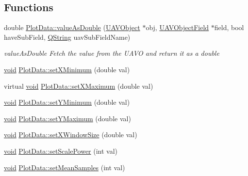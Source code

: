 \subsection*{\-Functions}
\begin{DoxyCompactItemize}
\item 
double \hyperlink{group___scope_plugin_ga7a54fec6758e8641d8baaefca4deddc9}{\-Plot\-Data\-::value\-As\-Double} (\hyperlink{class_u_a_v_object}{\-U\-A\-V\-Object} $\ast$obj, \hyperlink{class_u_a_v_object_field}{\-U\-A\-V\-Object\-Field} $\ast$field, bool have\-Sub\-Field, \hyperlink{group___u_a_v_objects_plugin_gab9d252f49c333c94a72f97ce3105a32d}{\-Q\-String} uav\-Sub\-Field\-Name)
\begin{DoxyCompactList}\small\item\em value\-As\-Double \-Fetch the value from the \-U\-A\-V\-O and return it as a double \end{DoxyCompactList}\item 
\hyperlink{group___u_a_v_objects_plugin_ga444cf2ff3f0ecbe028adce838d373f5c}{void} \hyperlink{group___scope_plugin_ga8352ce6b7eb9118afa04e021fbba40cc}{\-Plot\-Data\-::set\-X\-Minimum} (double val)
\item 
virtual \hyperlink{group___u_a_v_objects_plugin_ga444cf2ff3f0ecbe028adce838d373f5c}{void} \hyperlink{group___scope_plugin_ga3f195254ad44f888d45d763d819d4341}{\-Plot\-Data\-::set\-X\-Maximum} (double val)
\item 
\hyperlink{group___u_a_v_objects_plugin_ga444cf2ff3f0ecbe028adce838d373f5c}{void} \hyperlink{group___scope_plugin_ga74a63f7995ced2fd9c0fffbde542e75b}{\-Plot\-Data\-::set\-Y\-Minimum} (double val)
\item 
\hyperlink{group___u_a_v_objects_plugin_ga444cf2ff3f0ecbe028adce838d373f5c}{void} \hyperlink{group___scope_plugin_ga7dcfb9885435134bdde7c5006213afd8}{\-Plot\-Data\-::set\-Y\-Maximum} (double val)
\item 
\hyperlink{group___u_a_v_objects_plugin_ga444cf2ff3f0ecbe028adce838d373f5c}{void} \hyperlink{group___scope_plugin_ga35f3eec02d08ef7ab235fe297178c265}{\-Plot\-Data\-::set\-X\-Window\-Size} (double val)
\item 
\hyperlink{group___u_a_v_objects_plugin_ga444cf2ff3f0ecbe028adce838d373f5c}{void} \hyperlink{group___scope_plugin_ga44aceae690d2c2ffa80cd32788d30264}{\-Plot\-Data\-::set\-Scale\-Power} (int val)
\item 
\hyperlink{group___u_a_v_objects_plugin_ga444cf2ff3f0ecbe028adce838d373f5c}{void} \hyperlink{group___scope_plugin_ga2964b875a2d538d227778614df3fdebc}{\-Plot\-Data\-::set\-Mean\-Samples} (int val)

\end{DoxyCompactItemize}
